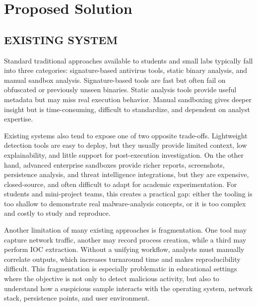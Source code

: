 \documentclass[a4paper,12pt,oneside]{report}
\begin{document}
\section{Proposed Solution}
\subsection{EXISTING SYSTEM}
Standard traditional approaches available to students and small labs typically fall into three categories: signature-based antivirus tools, static binary analysis, and manual sandbox analysis. Signature-based tools are fast but often fail on obfuscated or previously unseen binaries. Static analysis tools provide useful metadata but may miss real execution behavior. Manual sandboxing gives deeper insight but is time-consuming, difficult to standardize, and dependent on analyst expertise.

\par

\par

Existing systems also tend to expose one of two opposite trade-offs. Lightweight detection tools are easy to deploy, but they usually provide limited context, low explainability, and little support for post-execution investigation. On the other hand, advanced enterprise sandboxes provide richer reports, screenshots, persistence analysis, and threat intelligence integrations, but they are expensive, closed-source, and often difficult to adapt for academic experimentation. For students and mini-project teams, this creates a practical gap: either the tooling is too shallow to demonstrate real malware-analysis concepts, or it is too complex and costly to study and reproduce.

\par

\par

Another limitation of many existing approaches is fragmentation. One tool may capture network traffic, another may record process creation, while a third may perform IOC extraction. Without a unifying workflow, analysts must manually correlate outputs, which increases turnaround time and makes reproducibility difficult. This fragmentation is especially problematic in educational settings where the objective is not only to detect malicious activity, but also to understand how a suspicious sample interacts with the operating system, network stack, persistence points, and user environment.
\end{document}
